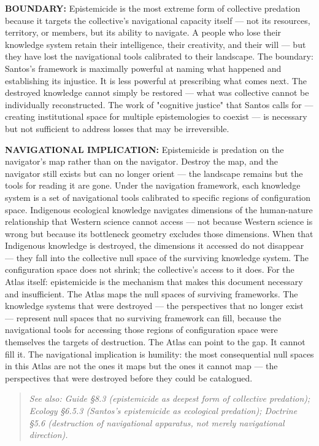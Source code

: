 \textbf{BOUNDARY:} Epistemicide is the most extreme form of collective predation because it targets the collective's navigational capacity itself — not its resources, territory, or members, but its ability to navigate. A people who lose their knowledge system retain their intelligence, their creativity, and their will — but they have lost the navigational tools calibrated to their landscape. The boundary: Santos's framework is maximally powerful at naming what happened and establishing its injustice. It is less powerful at prescribing what comes next. The destroyed knowledge cannot simply be restored — what was collective cannot be individually reconstructed. The work of "cognitive justice" that Santos calls for — creating institutional space for multiple epistemologies to coexist — is necessary but not sufficient to address losses that may be irreversible.


\textbf{NAVIGATIONAL IMPLICATION:} Epistemicide is predation on the navigator's map rather than on the navigator. Destroy the map, and the navigator still exists but can no longer orient — the landscape remains but the tools for reading it are gone. Under the navigation framework, each knowledge system is a set of navigational tools calibrated to specific regions of configuration space. Indigenous ecological knowledge navigates dimensions of the human-nature relationship that Western science cannot access — not because Western science is wrong but because its bottleneck geometry excludes those dimensions. When that Indigenous knowledge is destroyed, the dimensions it accessed do not disappear — they fall into the collective null space of the surviving knowledge system. The configuration space does not shrink; the collective's access to it does. For the Atlas itself: epistemicide is the mechanism that makes this document necessary and insufficient. The Atlas maps the null spaces of surviving frameworks. The knowledge systems that were destroyed — the perspectives that no longer exist — represent null spaces that no surviving framework can fill, because the navigational tools for accessing those regions of configuration space were themselves the targets of destruction. The Atlas can point to the gap. It cannot fill it. The navigational implication is humility: the most consequential null spaces in this Atlas are not the ones it maps but the ones it cannot map — the perspectives that were destroyed before they could be catalogued.


\begin{quote}
\itshape
\textit{See also: Guide §8.3 (epistemicide as deepest form of collective predation); Ecology §6.5.3 (Santos's epistemicide as ecological predation); Doctrine §5.6 (destruction of navigational apparatus, not merely navigational direction).}
\end{quote}


\bigskip\noindent\makebox[\textwidth]{\color{rulegray}\rule{5cm}{0.3pt}}\bigskip
